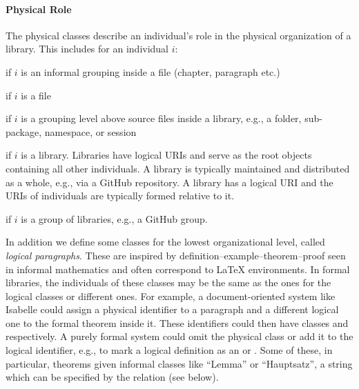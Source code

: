 \paragraph{Physical Role}
The physical classes describe an individual's role in the physical organization of a library.
This includes for an individual $i$:
\begin{compactitem}
 \item {} if $i$ is an informal grouping inside a file (chapter, paragraph etc.)
 \item {} if $i$ is a file
 \item {} if $i$ is a grouping level above source files inside a library, e.g., a folder, sub-package, namespace, or session
 \item {} if $i$ is a library. Libraries have logical URIs and serve as the root objects containing all other individuals.
 A library is typically maintained and distributed as a whole, e.g., via a GitHub repository.
 A library has a logical URI and the URIs of individuals are typically formed relative to it.
 \item {} if $i$ is a group of libraries, e.g., a GitHub group.
\end{compactitem}

\noindent In addition we define some classes for the lowest organizational level, called \emph{logical paragraphs}.
These are inspired by definition--example--theorem--proof seen in informal mathematics and often correspond to {\LaTeX} environments.
In formal libraries, the individuals of these classes may be the same as the ones for the logical classes or different ones.
For example, a document-oriented system like Isabelle could assign a physical identifier to a paragraph and a different logical one to the formal theorem inside it.
These identifiers could then have classes  and \truthObject respectively. %
A purely formal system could omit the physical class or add it to the logical identifier, e.g., to mark a logical definition as an  or .
Some of these, in particular, theorems given informal classes like ``Lemma'' or ``Hauptsatz'', a string which can be specified by the  relation (see below).
 

